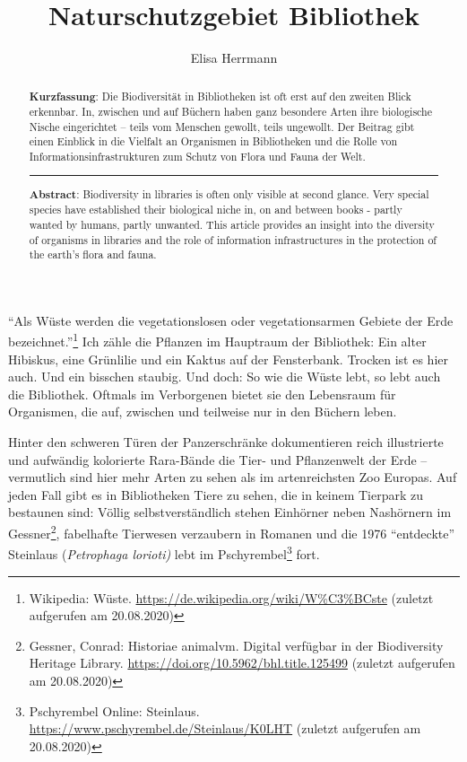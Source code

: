 \documentclass[a4paper,
fontsize=11pt,
oneside,
numbers=noperiodatend,
parskip=half-,
bibliography=totoc,
final
]{scrartcl}
\title{\LARGE{Naturschutzgebiet Bibliothek}}%
\author{Elisa Herrmann} %
\date{}
\begin{document}
\maketitle
\thispagestyle{fancyplain} 

\begin{abstract}
\noindent
\textbf{Kurzfassung}: Die Biodiversität in Bibliotheken ist oft erst auf
den zweiten Blick erkennbar. In, zwischen und auf Büchern haben ganz
besondere Arten ihre biologische Nische eingerichtet -- teils vom
Menschen gewollt, teils ungewollt. Der Beitrag gibt einen Einblick in
die Vielfalt an Organismen in Bibliotheken und die Rolle von
Informationsinfrastrukturen zum Schutz von Flora und Fauna der Welt.

\begin{center}\rule{0.5\linewidth}{0.5pt}\end{center}

\textbf{Abstract}: Biodiversity in libraries is often only visible at
second glance. Very special species have established their biological
niche in, on and between books - partly wanted by humans, partly
unwanted. This article provides an insight into the diversity of
organisms in libraries and the role of information infrastructures in
the protection of the earth's flora and fauna.
\end{abstract}

\enquote{Als Wüste werden die vegetationslosen oder vegetationsarmen
Gebiete der Erde bezeichnet.}\footnote{Wikipedia: Wüste.
  \url{https://de.wikipedia.org/wiki/W\%C3\%BCste} (zuletzt aufgerufen
  am 20.08.2020)} Ich zähle die Pflanzen im Hauptraum der Bibliothek:
Ein alter Hibiskus, eine Grünlilie und ein Kaktus auf der Fensterbank.
Trocken ist es hier auch. Und ein bisschen staubig. Und doch: So wie die
Wüste lebt, so lebt auch die Bibliothek. Oftmals im Verborgenen bietet
sie den Lebensraum für Organismen, die auf, zwischen und teilweise nur
in den Büchern leben.

Hinter den schweren Türen der Panzerschränke dokumentieren reich
illustrierte und aufwändig kolorierte Rara-Bände die Tier- und
Pflanzenwelt der Erde -- vermutlich sind hier mehr Arten zu sehen als im
artenreichsten Zoo Europas. Auf jeden Fall gibt es in Bibliotheken Tiere
zu sehen, die in keinem Tierpark zu bestaunen sind: Völlig
selbstverständlich stehen Einhörner neben Nashörnern im
Gessner\footnote{Gessner, Conrad: Historiae animalvm. Digital verfügbar
  in der Biodiversity Heritage Library.
  \url{https://doi.org/10.5962/bhl.title.125499} (zuletzt aufgerufen am
  20.08.2020)}, fabelhafte Tierwesen verzaubern in Romanen und die 1976
\enquote{entdeckte} Steinlaus (\emph{Petrophaga lorioti)} lebt im
Pschyrembel\footnote{Pschyrembel Online: Steinlaus.
  \url{https://www.pschyrembel.de/Steinlaus/K0LHT} (zuletzt aufgerufen
  am 20.08.2020)} fort.
\end{document}
